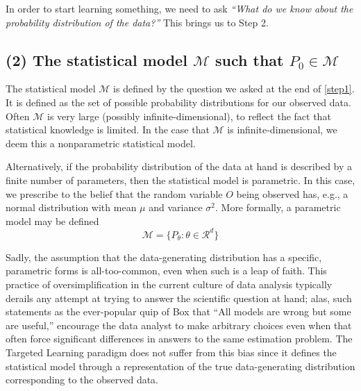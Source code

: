 \documentclass[
  12pt, krantz2,
]{book}
\theoremstyle{definition}
\theoremstyle{definition}
\theoremstyle{definition}
\newcommand{\1}{\mathbbm{1}}
\begin{document}
In order to start learning something, we need to ask \emph{``What do we know about the
probability distribution of the data?''} This brings us to Step 2.

\hypertarget{the-statistical-model-mathcalm-such-that-p_0-in-mathcalm}{%
\subsection*{\texorpdfstring{(2) The statistical model \(\mathcal{M}\) such that \(P_0 \in \mathcal{M}\)}{(2) The statistical model \textbackslash mathcal\{M\} such that P\_0 \textbackslash in \textbackslash mathcal\{M\}}}\label{the-statistical-model-mathcalm-such-that-p_0-in-mathcalm}}


The statistical model \(\mathcal{M}\) is defined by the question we asked at the
end of \ref{step1}. It is defined as the set of possible probability
distributions for our observed data. Often \(\mathcal{M}\) is very large (possibly
infinite-dimensional), to reflect the fact that statistical knowledge is
limited. In the case that \(\mathcal{M}\) is infinite-dimensional, we deem this a
nonparametric statistical model.

Alternatively, if the probability distribution of the data at hand is described
by a finite number of parameters, then the statistical model is parametric. In
this case, we prescribe to the belief that the random variable \(O\) being
observed has, e.g., a normal distribution with mean \(\mu\) and variance
\(\sigma^2\). More formally, a parametric model may be defined
\begin{equation*}
  \mathcal{M} = \{P_{\theta} : \theta \in \mathcal{R}^d \}
\end{equation*}

Sadly, the assumption that the data-generating distribution has a specific,
parametric forms is all-too-common, even when such is a leap of faith. This
practice of oversimplification in the current culture of data analysis typically
derails any attempt at trying to answer the scientific question at hand; alas,
such statements as the ever-popular quip of Box that ``All models are wrong but
some are useful,'' encourage the data analyst to make arbitrary choices even when
that often force significant differences in answers to the same estimation
problem. The Targeted Learning paradigm does not suffer from this bias since it
defines the statistical model through a representation of the true
data-generating distribution corresponding to the observed data.
\end{document}

